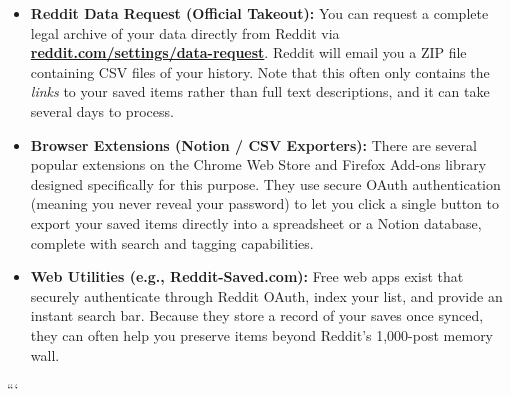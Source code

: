 \documentclass[
]{report}
\providecommand{\tightlist}{%
  \setlength{\itemsep}{0pt}\setlength{\parskip}{0pt}}\usepackage{longtable,booktabs,array}
\begin{document}
\begin{itemize}
\tightlist
\item
  \textbf{Reddit Data Request (Official Takeout):} You can request a
  complete legal archive of your data directly from Reddit via
  \textbf{\href{https://www.google.com/search?q=https://reddit.com/settings/data-request}{reddit.com/settings/data-request}}.
  Reddit will email you a ZIP file containing CSV files of your history.
  Note that this often only contains the \emph{links} to your saved
  items rather than full text descriptions, and it can take several days
  to process.
\item
  \textbf{Browser Extensions (Notion / CSV Exporters):} There are
  several popular extensions on the Chrome Web Store and Firefox Add-ons
  library designed specifically for this purpose. They use secure OAuth
  authentication (meaning you never reveal your password) to let you
  click a single button to export your saved items directly into a
  spreadsheet or a Notion database, complete with search and tagging
  capabilities.
\item
  \textbf{Web Utilities (e.g., Reddit-Saved.com):} Free web apps exist
  that securely authenticate through Reddit OAuth, index your list, and
  provide an instant search bar. Because they store a record of your
  saves once synced, they can often help you preserve items beyond
  Reddit's 1,000-post memory wall.
\end{itemize}

```
\end{document}
